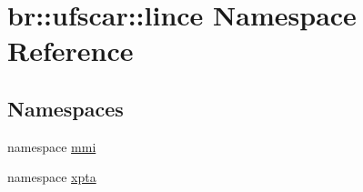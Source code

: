 \hypertarget{namespacebr_1_1ufscar_1_1lince}{
\section{br::ufscar::lince Namespace Reference}
\label{namespacebr_1_1ufscar_1_1lince}
}
\subsection*{Namespaces}
\begin{DoxyCompactItemize}
\item 
namespace \hyperlink{namespacebr_1_1ufscar_1_1lince_1_1mmi}{mmi}
\item 
namespace \hyperlink{namespacebr_1_1ufscar_1_1lince_1_1xpta}{xpta}
\end{DoxyCompactItemize}

